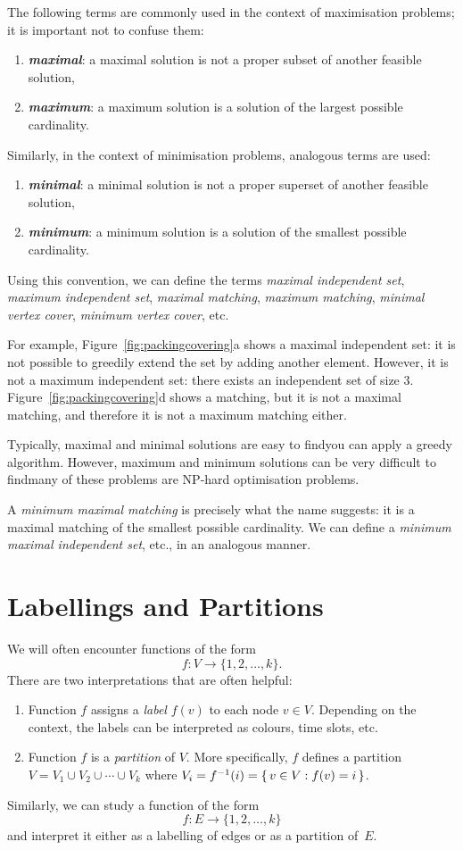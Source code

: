 The following terms are commonly used in the context of maximisation problems; it is important not to confuse them:
\begin{enumerate}
    \item \textbf{\emph{maximal}}: a maximal solution is not a proper subset of another feasible solution,
    \item \textbf{\emph{maximum}}: a maximum solution is a solution of the largest possible cardinality.
\end{enumerate}
Similarly, in the context of minimisation problems, analogous terms are used:
\begin{enumerate}
    \item \textbf{\emph{minimal}}: a minimal solution is not a proper superset of another feasible solution,
    \item \textbf{\emph{minimum}}: a minimum solution is a solution of the smallest possible cardinality.
\end{enumerate}
Using this convention, we can define the terms \emph{maximal independent set}, \emph{maximum independent set}, \emph{maximal matching}, \emph{maximum matching}, \emph{minimal vertex cover}, \emph{minimum vertex cover}, etc.

For example, Figure~\ref{fig:packingcovering}a shows a maximal independent set: it is not possible to greedily extend the set by adding another element. However, it is not a maximum independent set: there exists an independent set of size $3$. Figure~\ref{fig:packingcovering}d shows a matching, but it is not a maximal matching, and therefore it is not a maximum matching either.

Typically, maximal and minimal solutions are easy to find\mydash you can apply a greedy algorithm. However, maximum and minimum solutions can be very difficult to find\mydash many of these problems are NP-hard optimisation problems.

A \emph{minimum maximal matching} is precisely what the name suggests: it is a maximal matching of the smallest possible cardinality. We can define a \emph{minimum maximal independent set}, etc., in an analogous manner.


\section{Labellings and Partitions}\label{sec:partitions}

We will often encounter functions of the form \[f\colon V \to \{1,2,\dotsc,k\}.\] There are two interpretations that are often helpful:
\begin{enumerate}[label=(\roman*)]
    \item Function $f$ assigns a \emph{label} $f(v)$ to each node $v \in V$. Depending on the context, the labels can be interpreted as colours, time slots, etc.
    \item Function $f$ is a \emph{partition} of $V$. More specifically, $f$ defines a partition $V = V_1 \cup V_2 \cup \dotsb \cup V_k$ where $V_i = f^{-1}(i) = \{\,  v \in V : f(v) = i  \,\}$.
\end{enumerate}
Similarly, we can study a function of the form \[f\colon E \to \{1,2,\dotsc,k\}\] and interpret it either as a labelling of edges or as a partition of~$E$.

